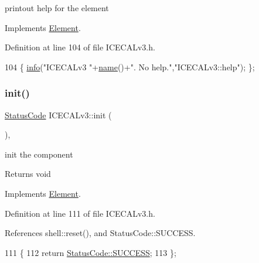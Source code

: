printout help for the element 

Implements \hyperlink{classElement_a32c0de27acb08e17251cef88c3e9303a}{Element}.



Definition at line 104 of file I\+C\+E\+C\+A\+Lv3.\+h.


\begin{DoxyCode}
104 \{ \hyperlink{classObject_a644fd329ea4cb85f54fa6846484b84a8}{info}(\textcolor{stringliteral}{"ICECALv3 "}+\hyperlink{classObject_a300f4c05dd468c7bb8b3c968868443c1}{name}()+\textcolor{stringliteral}{". No help."},\textcolor{stringliteral}{"ICECALv3::help"}); \};
\end{DoxyCode}
\mbox{\label{classICECALv3_abf7281fad80b80b70c5b13ce66ba3451}} 
\subsubsection{\texorpdfstring{init()}{init()}}
{\footnotesize\ttfamily \hyperlink{classStatusCode}{Status\+Code} I\+C\+E\+C\+A\+Lv3\+::init (\begin{DoxyParamCaption}{ }\end{DoxyParamCaption})\hspace{0.3cm}{\ttfamily [inline]}, {\ttfamily [virtual]}}

init the component

\begin{DoxyReturn}{Returns}
void 
\end{DoxyReturn}


Implements \hyperlink{classElement_af42754b5cabc198869222725218d695c}{Element}.



Definition at line 111 of file I\+C\+E\+C\+A\+Lv3.\+h.



References shell\+::reset(), and Status\+Code\+::\+S\+U\+C\+C\+E\+SS.


\begin{DoxyCode}
111                     \{
112     \textcolor{keywordflow}{return} \hyperlink{classStatusCode_a6f565cbeadc76d14c72f047e5e85eb4badd0da38d3ba0d922efd1f4619bc37ad8}{StatusCode::SUCCESS};
113   \};
\end{DoxyCode}
\mbox{\label{classICECALv3_a04b02e583f191bfce34d05132cd23834}} 
